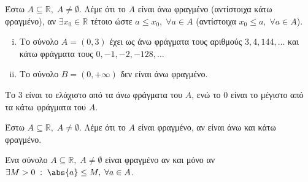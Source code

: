 \documentclass[main.tex]{subfiles}
\begin{document}
\begin{dfn}
    Έστω $ A \subseteq \mathbb{R}, \; A \neq \emptyset $. Λέμε ότι το 
    $A$ είναι άνω φραγμένο (αντίστοιχα κάτω φραγμένο), αν $ 
    \exists x_{0} \in \mathbb{R}$ τέτοιο ώστε $ a \leq x_{0}, \; 
    \forall a \in A$ (αντίστοιχα $ x_{0} \leq a, \; \forall a \in A $).
\end{dfn}

\begin{example}
\item {}
    \begin{enumerate}[i)]
        \item Το  σύνολο $ A = (0,3) $  έχει ως άνω φράγματα τους αριθμούς 
            $ 3, 4, 144, \ldots$ και κάτω φράγματα τους 
            $ 0, -1, -2, -128, \ldots $ 

        \item Το σύνολο $ B = (0,+\infty) $ δεν είναι άνω φραγμένο.
    \end{enumerate}
\end{example}

\begin{rem}
    Το  $ 3 $ είναι το ελάχιστο από τα άνω φράγματα του $A$, ενώ το $ 0
    $ είναι το μέγιστο από τα κάτω φράγματα του $A$. 
\end{rem}


\begin{dfn}
    Έστω $ A \subseteq \mathbb{R}, \; A \neq \emptyset $. Λέμε ότι το $A$ 
    είναι φραγμένο, αν είναι άνω και κάτω φραγμένο. 
\end{dfn}

\begin{prop}
    Ένα σύνολο $ A \subseteq \mathbb{R}, \; A \neq \emptyset $ είναι 
    φραγμένο αν και μόνο αν $ \exists M>0 \; : \; \abs{a} \leq M, \; 
    \forall a \in A$.
\end{prop}
\end{document}
